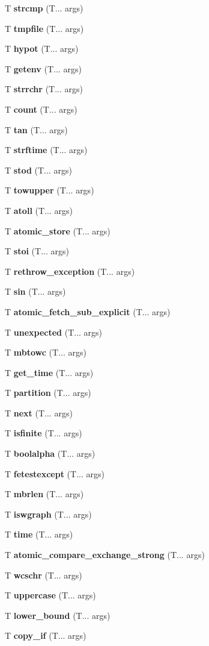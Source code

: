 \begin{DoxyCompactItemize}
T \textbf{ strcmp} (T... args)
\item 
T \textbf{ tmpfile} (T... args)
\item 
T \textbf{ hypot} (T... args)
\item 
T \textbf{ getenv} (T... args)
\item 
T \textbf{ strrchr} (T... args)
\item 
T \textbf{ count} (T... args)
\item 
T \textbf{ tan} (T... args)
\item 
T \textbf{ strftime} (T... args)
\item 
T \textbf{ stod} (T... args)
\item 
T \textbf{ towupper} (T... args)
\item 
T \textbf{ atoll} (T... args)
\item 
T \textbf{ atomic\+\_\+store} (T... args)
\item 
T \textbf{ stoi} (T... args)
\item 
T \textbf{ rethrow\+\_\+exception} (T... args)
\item 
T \textbf{ sin} (T... args)
\item 
T \textbf{ atomic\+\_\+fetch\+\_\+sub\+\_\+explicit} (T... args)
\item 
T \textbf{ unexpected} (T... args)
\item 
T \textbf{ mbtowc} (T... args)
\item 
T \textbf{ get\+\_\+time} (T... args)
\item 
T \textbf{ partition} (T... args)
\item 
T \textbf{ next} (T... args)
\item 
T \textbf{ isfinite} (T... args)
\item 
T \textbf{ boolalpha} (T... args)
\item 
T \textbf{ fetestexcept} (T... args)
\item 
T \textbf{ mbrlen} (T... args)
\item 
T \textbf{ iswgraph} (T... args)
\item 
T \textbf{ time} (T... args)
\item 
T \textbf{ atomic\+\_\+compare\+\_\+exchange\+\_\+strong} (T... args)
\item 
T \textbf{ wcschr} (T... args)
\item 
T \textbf{ uppercase} (T... args)
\item 
T \textbf{ lower\+\_\+bound} (T... args)
\item 
T \textbf{ copy\+\_\+if} (T... args)
\item 

\end{DoxyCompactItemize}

